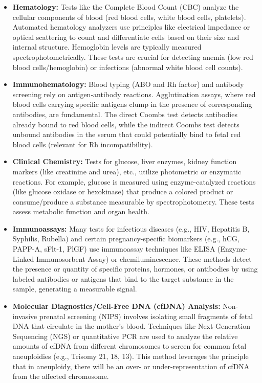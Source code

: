 \documentclass{article}
\begin{document}
\begin{itemize}
    \item \textbf{Hematology:} Tests like the Complete Blood Count (CBC) analyze the cellular components of blood (red blood cells, white blood cells, platelets). Automated hematology analyzers use principles like electrical impedance or optical scattering to count and differentiate cells based on their size and internal structure. Hemoglobin levels are typically measured spectrophotometrically. These tests are crucial for detecting anemia (low red blood cells/hemoglobin) or infections (abnormal white blood cell counts).
    \item \textbf{Immunohematology:} Blood typing (ABO and Rh factor) and antibody screening rely on antigen-antibody reactions. Agglutination assays, where red blood cells carrying specific antigens clump in the presence of corresponding antibodies, are fundamental. The direct Coombs test detects antibodies already bound to red blood cells, while the indirect Coombs test detects unbound antibodies in the serum that could potentially bind to fetal red blood cells (relevant for Rh incompatibility).
    \item \textbf{Clinical Chemistry:} Tests for glucose, liver enzymes, kidney function markers (like creatinine and urea), etc., utilize photometric or enzymatic reactions. For example, glucose is measured using enzyme-catalyzed reactions (like glucose oxidase or hexokinase) that produce a colored product or consume/produce a substance measurable by spectrophotometry. These tests assess metabolic function and organ health.
    \item \textbf{Immunoassays:} Many tests for infectious diseases (e.g., HIV, Hepatitis B, Syphilis, Rubella) and certain pregnancy-specific biomarkers (e.g., hCG, PAPP-A, sFlt-1, PlGF) use immunoassay techniques like ELISA (Enzyme-Linked Immunosorbent Assay) or chemiluminescence. These methods detect the presence or quantity of specific proteins, hormones, or antibodies by using labeled antibodies or antigens that bind to the target substance in the sample, generating a measurable signal.
    \item \textbf{Molecular Diagnostics/Cell-Free DNA (cfDNA) Analysis:} Non-invasive prenatal screening (NIPS) involves isolating small fragments of fetal DNA that circulate in the mother's blood. Techniques like Next-Generation Sequencing (NGS) or quantitative PCR are used to analyze the relative amounts of cfDNA from different chromosomes to screen for common fetal aneuploidies (e.g., Trisomy 21, 18, 13). This method leverages the principle that in aneuploidy, there will be an over- or under-representation of cfDNA from the affected chromosome.
\end{itemize}
\end{document}

